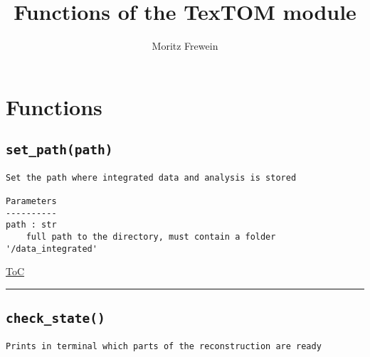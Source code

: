 \documentclass{article}
\title{Functions of the TexTOM module}
\author{Moritz Frewein}
\begin{document}
\maketitle
\label{toc}
\tableofcontents

                
\subsectionfont{\large\ttfamily\raggedright}


\section{Functions}\label{sec:functions}

\subsection*{\texttt{set\_path(path)}}

\begin{lstlisting}[language=docstring]
Set the path where integrated data and analysis is stored

Parameters
----------
path : str
    full path to the directory, must contain a folder '/data_integrated'
\end{lstlisting}

\begin{flushright}

\hyperref[toc]{ToC}

\end{flushright}



\vspace{5mm}

\hrule

\subsection*{\texttt{check\_state()}}

\begin{lstlisting}[language=docstring]
Prints in terminal which parts of the reconstruction are ready
    
\end{lstlisting}
\end{document}
